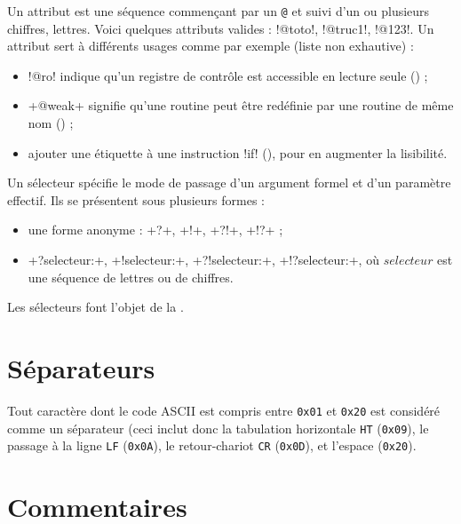 Un attribut est une séquence commençant par un \texttt{@} et suivi d'un ou plusieurs chiffres, lettres. Voici quelques attributs valides : \plm!@toto!, \plm!@truc1!, \plm!@123!. Un attribut sert à différents usages comme par exemple (liste non exhautive) :
\begin{itemize}
  \item \plm!@ro! indique qu'un registre de contrôle est accessible en lecture seule () ;
  \item \plm+@weak+ signifie qu'une routine peut être redéfinie par une routine de même nom () ;
  \item ajouter une étiquette à une instruction \plm!if! (), pour en augmenter la lisibilité.
\end{itemize}









Un sélecteur spécifie le mode de passage d'un argument formel et d'un paramètre effectif. Ils se présentent sous plusieurs formes :
\begin{itemize}
  \item une forme anonyme : \plm+?+, \plm+!+, \plm+?!+, \plm+!?+ ;
  \item \plm+?selecteur:+, \plm+!selecteur:+, \plm+?!selecteur:+, \plm+!?selecteur:+, où $selecteur$ est une séquence de lettres ou de chiffres.
\end{itemize}



Les sélecteurs font l'objet de la .

\section{Séparateurs}

Tout caractère dont le code ASCII est compris entre \texttt{0x01} et \texttt{0x20} est considéré comme un séparateur (ceci inclut donc la tabulation horizontale \texttt{HT} (\texttt{0x09}), le passage à la ligne \texttt{LF} (\texttt{0x0A}), le retour-chariot \texttt{CR} (\texttt{0x0D}), et l’espace (\texttt{0x20}).









\section{Commentaires}

